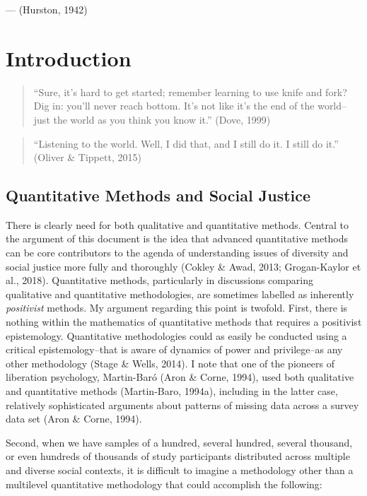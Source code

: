 \documentclass[
  letterpaper,
  DIV=11,
  numbers=noendperiod]{scrreprt}
\begin{document}
--- (Hurston, 1942)


\hypertarget{introduction}{%
\chapter{Introduction}\label{introduction}}

\begin{quote}
``Sure, it's hard to get started; remember learning to use knife and
fork? Dig in: you'll never reach bottom. It's not like it's the end of
the world--just the world as you think you know it.'' (Dove, 1999)
\end{quote}

\begin{quote}
``Listening to the world. Well, I did that, and I still do it. I still
do it.'' (Oliver \& Tippett, 2015)
\end{quote}

\hypertarget{quantitative-methods-and-social-justice}{%
\section{Quantitative Methods and Social
Justice}\label{quantitative-methods-and-social-justice}}

There is clearly need for both qualitative and quantitative methods.
Central to the argument of this document is the idea that advanced
quantitative methods can be core contributors to the agenda of
understanding issues of diversity and social justice more fully and
thoroughly (Cokley \& Awad, 2013; Grogan-Kaylor et al., 2018).
Quantitative methods, particularly in discussions comparing qualitative
and quantitative methodologies, are sometimes labelled as inherently
\emph{positivist} methods. My argument regarding this point is twofold.
First, there is nothing within the mathematics of quantitative methods
that requires a positivist epistemology. Quantitative methodologies
could as easily be conducted using a critical epistemology--that is
aware of dynamics of power and privilege--as any other methodology
(Stage \& Wells, 2014). I note that one of the pioneers of liberation
psychology, Martin-Baró (Aron \& Corne, 1994), used both qualitative and
quantitative methods (Martin-Baro, 1994a), including in the latter case,
relatively sophisticated arguments about patterns of missing data across
a survey data set (Aron \& Corne, 1994).

Second, when we have samples of a hundred, several hundred, several
thousand, or even hundreds of thousands of study participants
distributed across multiple and diverse social contexts, it is difficult
to imagine a methodology other than a multilevel quantitative
methodology that could accomplish the following:
\end{document}
